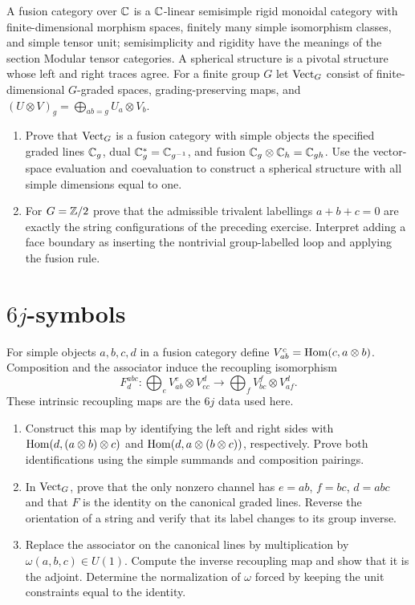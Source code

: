 \begin{exercise}
A fusion category over $\mathbb C$ is a $\mathbb C$-linear semisimple rigid monoidal
category with finite-dimensional morphism spaces, finitely many simple
isomorphism classes, and simple tensor unit; semisimplicity and rigidity
have the meanings of the section Modular tensor categories. A spherical
structure is a pivotal structure whose left and right traces agree.
For a finite group $G$ let $\operatorname{Vect}_G$ consist of finite-dimensional
$G$-graded spaces, grading-preserving maps, and
$(U\otimes V)_g=\bigoplus_{ab=g}U_a\otimes V_b$.
\begin{enumerate}[label=(\alph*)]
\item Prove that $\operatorname{Vect}_G$ is a fusion category with simple objects
the specified graded lines $\mathbb C_g$, dual $\mathbb C_g^*=\mathbb C_{g^{-1}}$,
and fusion $\mathbb C_g\otimes\mathbb C_h=\mathbb C_{gh}$. Use the vector-space evaluation
and coevaluation to construct a spherical structure with all simple
dimensions equal to one.
\item For $G=\mathbb Z/2$ prove that the admissible trivalent labellings
$a+b+c=0$ are exactly the string configurations of the preceding
exercise. Interpret adding a face boundary as inserting the
nontrivial group-labelled loop and applying the fusion rule.
\end{enumerate}
\end{exercise}

\section{\texorpdfstring{$6j$}{6j}-symbols}

\begin{exercise}
For simple objects $a,b,c,d$ in a fusion category define
$V_{ab}^c=\operatorname{Hom}(c,a\otimes b)$. Composition and the associator induce
the recoupling isomorphism
\[
 F^{abc}_d:
 \bigoplus_e V_{ab}^e\otimes V_{ec}^d
 \longrightarrow
 \bigoplus_f V_{bc}^f\otimes V_{af}^d.
\]
These intrinsic recoupling maps are the $6j$ data used here.
\begin{enumerate}[label=(\alph*)]
\item Construct this map by identifying the left and right sides
with $\operatorname{Hom}(d,(a\otimes b)\otimes c)$ and
$\operatorname{Hom}(d,a\otimes(b\otimes c))$, respectively. Prove both identifications
using the simple summands and composition pairings.
\item In $\operatorname{Vect}_G$, prove that the only nonzero channel has
$e=ab$, $f=bc$, $d=abc$ and that $F$ is the identity on the
canonical graded lines. Reverse the orientation of a string and
verify that its label changes to its group inverse.
\item Replace the associator on the canonical lines by multiplication
by $\omega(a,b,c)\in U(1)$. Compute the inverse recoupling map
and show that it is the adjoint. Determine the normalization of
$\omega$ forced by keeping the unit constraints equal to the identity.
\end{enumerate}
\end{exercise}

